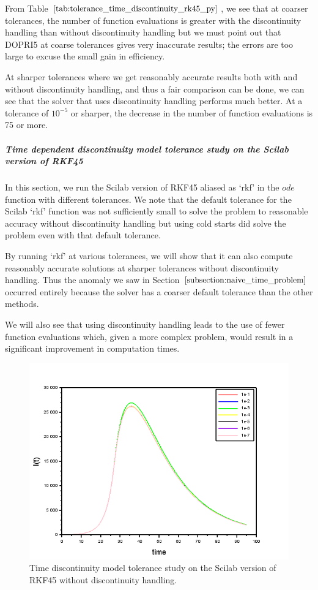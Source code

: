 From Table $\ref{tab:tolerance_time_discontinuity_rk45_py}$, we see that at coarser tolerances, the number of function evaluations is greater with the discontinuity handling than without discontinuity handling but we must point out that DOPRI5 at coarse tolerances gives very inaccurate results; the errors are too large to excuse the small gain in efficiency.

At sharper tolerances where we get reasonably accurate results both with and without discontinuity handling, and thus a fair comparison can be done, we can see that the solver that uses discontinuity handling performs much better. At a tolerance of $10^{-5}$ or sharper, the decrease in the number of function evaluations is 75 or more.

\subparagraph{Time dependent discontinuity model tolerance study on the Scilab version of RKF45}
In this section, we run the Scilab version of RKF45 aliased as `rkf' in the $ode$ function with different tolerances. We note that the default tolerance for the Scilab `rkf' function was not sufficiently small to solve the problem to reasonable accuracy without discontinuity handling but using cold starts did solve the problem even with that default tolerance. 

By running `rkf' at various tolerances, we will show that it can also compute reasonably accurate solutions at sharper tolerances without discontinuity handling. Thus the anomaly we saw in Section $\ref{subsection:naive_time_problem}$ occurred entirely because the solver has a coarser default tolerance than the other methods.

We will also see that using discontinuity handling leads to the use of fewer function evaluations which, given a more complex problem, would result in a significant improvement in computation times.

\begin{figure}[H]
\centering
\includegraphics[width=0.7\linewidth]{./figures/tolerance_time_rk45_no_event_sci}
\caption{Time discontinuity model tolerance study on the Scilab version of RKF45 without discontinuity handling.}
\label{fig:tolerance_time_rk45_no_event_sci}
\end{figure}

